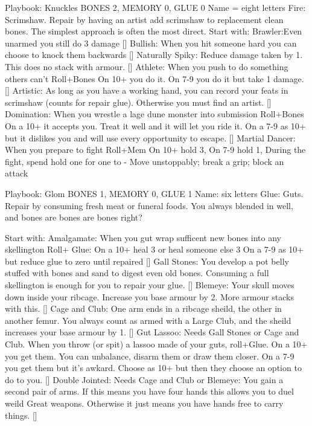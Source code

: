 Playbook: Knuckles
BONES 2, MEMORY 0, GLUE 0  
Name = eight letters
Fire: Scrimshaw. Repair by having an artist add scrimshaw to replacement clean bones.
The simplest approach is often the most direct.
Start with: Brawler:Even unarmed you still do 3 damage
[] Bullish: When you hit someone hard you can choose to knock them backwards
[] Naturally Spiky: Reduce damage taken by 1. This does no stack with armour.
[] Athlete: When you push to do something others can't Roll+Bones
On 10+ you do it.
On 7-9 you do it but take 1 damage.
[] Artistic: As long as you have a working hand, you can record your feats in scrimshaw (counts for repair glue). Otherwise you must find an artist.
[] Domination: When you wrestle a lage dune monster into submission Roll+Bones 
On a 10+ it accepts you. Treat it well and it will let you ride it.
On a 7-9 as 10+ but it dislikes you and will use every opportunity to escape.
[] Martial Dancer: When you prepare to fight Roll+Mem
On 10+ hold 3,
On 7-9 hold 1,
During the fight, spend hold one for one to - Move unstoppably; break a grip; block an attack

Playbook: Glom
BONES 1, MEMORY 0, GLUE 1  
Name: six letters
Glue: Guts. Repair by consuming fresh meat or funeral foods.
You always blended in well, and bones are bones are bones right?

Start with: Amalgamate: When you gut wrap sufficent new bones into any skellington Roll+ Glue: 
On a 10+ heal 3 or heal someone else 3 
On a 7-9 as 10+ but reduce glue to zero until repaired
[] Gall Stones: You develop a pot belly stuffed with bones and sand to digest even old bones. Consuming a full skellington is enough for you to repair your glue.
[] Blemeye: Your skull moves down inside your ribcage. Increase you base armour by 2. More armour stacks with this.
[] Cage and Club: One arm ends in a ribcage sheild, the other in another femur. You always count as armed with a Large Club, and the sheild increases your base armour by 1. 
[] Gut Lassoo: Needs Gall Stones or Cage and Club. When you throw (or spit) a lassoo made of your guts, roll+Glue.
On a 10+ you get them. You can unbalance, disarm them or draw them closer.
On a 7-9 you get them but it's awkard. Choose as 10+ but then they choose an option to do to you.
[] Double Jointed: Needs Cage and Club or Blemeye: You gain a second pair of arms. If this means you have four hands this allows you to duel weild Great weapons. Otherwise it just means you have hands free to carry things.
[] 



